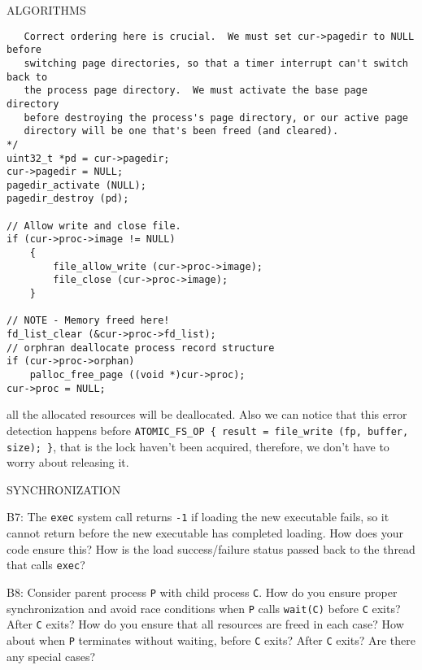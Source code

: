 \begin{aspect}{ALGORITHMS}
\begin{lstlisting}
   Correct ordering here is crucial.  We must set cur->pagedir to NULL before
   switching page directories, so that a timer interrupt can't switch back to
   the process page directory.  We must activate the base page directory
   before destroying the process's page directory, or our active page
   directory will be one that's been freed (and cleared).
*/
uint32_t *pd = cur->pagedir;
cur->pagedir = NULL;
pagedir_activate (NULL);
pagedir_destroy (pd);

// Allow write and close file.
if (cur->proc->image != NULL)
	{
		file_allow_write (cur->proc->image);
		file_close (cur->proc->image);
	}

// NOTE - Memory freed here!
fd_list_clear (&cur->proc->fd_list);
// orphran deallocate process record structure
if (cur->proc->orphan)
	palloc_free_page ((void *)cur->proc);
cur->proc = NULL;
\end{lstlisting}
all the allocated resources will be deallocated. Also we can notice that this error detection happens before \lstinline|ATOMIC_FS_OP { result = file_write (fp, buffer, size); }|, that is the lock haven't been acquired, therefore, we don't have to worry about releasing it.
\end{aspect}

\begin{aspect}{SYNCHRONIZATION}
	\begin{qc}
		B7: The \lstinline{exec} system call returns \lstinline{-1}
		if loading the new executable fails, so it cannot return before the new executable has completed loading.
		How does your code ensure this?
		How is the load success/failure status passed back to the thread that calls \lstinline{exec}?
	\end{qc}

	\begin{qc}
		B8: Consider parent process \lstinline{P} with child process \lstinline{C}.
		How do you ensure proper synchronization and avoid race conditions
		when \lstinline{P} calls \lstinline{wait(C)} before \lstinline{C} exits? After \lstinline{C} exits?
		How do you ensure that all resources are freed in each case?
		How about when \lstinline{P} terminates without waiting, before \lstinline{C} exits? After \lstinline{C} exits?
		Are there any special cases?
	\end{qc}

\end{aspect}

